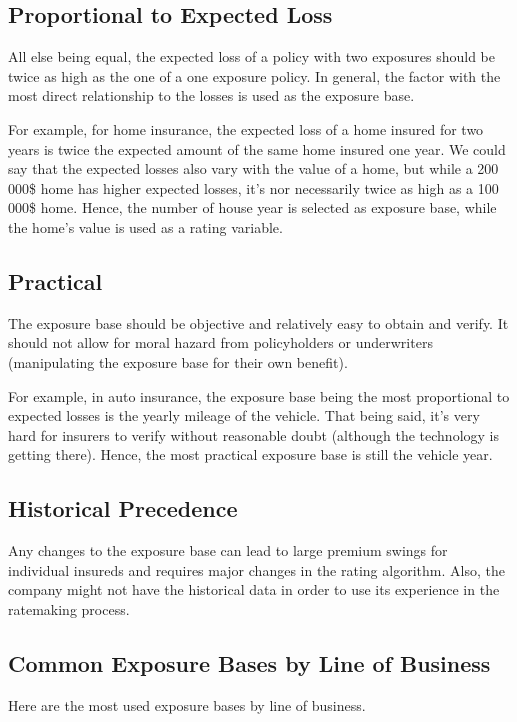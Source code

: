 \documentclass[11pt, english]{memoir}
\numberwithin{definition}{section}
\begin{document}
	\subsection{Proportional to Expected Loss}
		All else being equal, the expected loss of a policy with two exposures should be twice as high as the one of a one exposure policy. In general, the factor with the most direct relationship to the losses is used as the exposure base. 
		
		For example, for home insurance, the expected loss of a home insured for two years is twice the expected amount of the same home insured one year. We could say that the expected losses also vary with the value of a home, but while a 200 000\$ home has higher expected losses, it's nor necessarily twice as high as a 100 000\$ home. Hence, the number of house year is selected as exposure base, while the home's value is used as a rating variable.  
	
	\subsection{Practical}
		The exposure base should be objective and relatively easy to obtain and verify. It should not allow for moral hazard from policyholders or underwriters (manipulating the exposure base for their own benefit). 
		
		For example, in auto insurance, the exposure base being the most proportional to expected losses is the yearly mileage of the vehicle. That being said, it's very hard for insurers to verify without reasonable doubt (although the technology is getting there). Hence, the most practical exposure base is still the vehicle year. 
	
	\subsection{Historical Precedence}
		Any changes to the exposure base can lead to large premium swings for individual insureds and requires major changes in the rating algorithm. Also, the company might not have the historical data in order to use its experience in the ratemaking process. 
	
	\subsection{Common Exposure Bases by Line of Business}
		Here are the most used exposure bases by line of business. 
	
\end{document}
